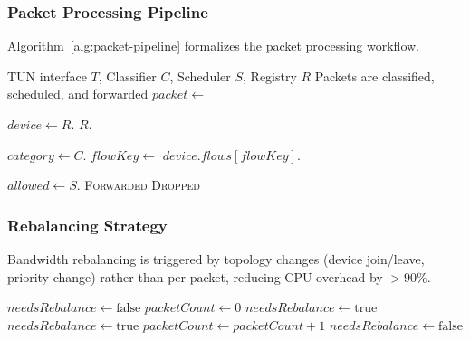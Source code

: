 \subsubsection{Packet Processing Pipeline}

Algorithm~\ref{alg:packet-pipeline} formalizes the packet processing workflow.

\begin{algorithm}[htbp]
\caption{Packet Processing Pipeline}
\label{alg:packet-pipeline}
\begin{algorithmic}[1]
\Require TUN interface $T$, Classifier $C$, Scheduler $S$, Registry $R$
\Ensure Packets are classified, scheduled, and forwarded
    \State $packet \gets$ 
        \State \Return {}
    \EndIf
    
    \State $device \gets R.$
    \State $R.$
    
    \State $category \gets C.$
    \State $flowKey \gets$ 
    \State $device.flows[flowKey].$
    
    \State $allowed \gets S.$
        \State {}
        \State \Return \textsc{Forwarded}
    \Else
        \State \Return \textsc{Dropped}
    \EndIf
\EndProcedure
\end{algorithmic}
\end{algorithm}

\subsubsection{Rebalancing Strategy}

Bandwidth rebalancing is triggered by topology changes (device join/leave, priority change) rather than per-packet, reducing CPU overhead by $>90\%$.

\begin{algorithm}[htbp]
\caption{Conditional Rebalancing}
\label{alg:rebalancing}
\begin{algorithmic}[1]
\State $needsRebalance \gets \text{false}$
\State $packetCount \gets 0$
    \State $needsRebalance \gets \text{true}$
\EndProcedure
{}
    \State $needsRebalance \gets \text{true}$
\EndProcedure
{}
    \State $packetCount \gets packetCount + 1$
        \State {}
        \State $needsRebalance \gets \text{false}$
    \EndIf
\EndProcedure
\end{algorithmic}
\end{algorithm}

